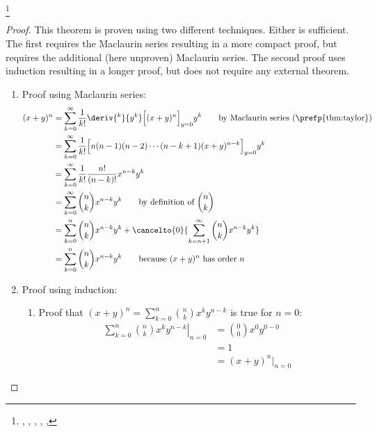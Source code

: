 \begin{theorem}
\footnote{
  ,
  ,
  ,
  ,
  ,
  }
\label{thm:binomial}
\end{theorem}
\begin{proof}
This theorem is proven using two different techniques. 
Either is sufficient.
The first requires the Maclaurin series resulting in a more compact proof,
but requires the additional (here unproven) Maclaurin series.
The second proof uses induction resulting in a longer proof, 
but does not require any external theorem.

\begin{enumerate}
\item Proof using Maclaurin series:
\begin{align*}
  (x+y)^n 
    &= \sum_{k=0}^\infty \frac{1}{k!} \deriv{^k}{y^k}\Big[(x+y)^n\Big]_{y=0} y^k
    \qquad\text{by Maclaurin series (\prefp{thm:taylor})}
  \\&= \sum_{k=0}^\infty \frac{1}{k!} \Big[n(n-1)(n-2)\cdots(n-k+1)(x+y)^{n-k}\Big]_{y=0} y^k
  \\&= \sum_{k=0}^\infty \frac{1}{k!} \frac{n!}{(n-k)!} x^{n-k} y^k
  \\&= \sum_{k=0}^\infty {n\choose k} x^{n-k} y^k
    \qquad\text{by definition of ${n\choose k}$}
  \\&= \sum_{k=0}^n {n\choose k} x^{n-k} y^k
      +\cancelto{0}{\sum_{k=n+1}^\infty {n\choose k} x^{n-k} y^k}
  \\&= \sum_{k=0}^n {n\choose k} x^{n-k} y^k
    \qquad\text{because $(x+y)^n$ has order $n$}
\end{align*}

\item Proof using induction:
\begin{enumerate}
\item Proof that
  $(x+y)^{n} = \sum_{k=0}^{n} {n \choose k} x^k y^{n-k}$
  is true for $n=0$:
\begin{align*}
  \left.\sum_{k=0}^{n} {n \choose k} x^k y^{n-k} \right|_{n=0}
    &= {0 \choose 0} x^0 y^{0-0}
  \\&= 1
  \\&= (x+y)^n|_{n=0}
\end{align*}


\end{enumerate}
\end{enumerate}
\end{proof}
